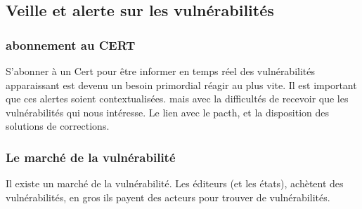 \subsection{Veille et alerte sur les vulnérabilités}

\subsubsection{abonnement au CERT}

S’abonner à un Cert pour être informer en temps réel des vulnérabilités apparaissant est devenu un besoin primordial réagir au plus vite. Il est important que ces alertes soient contextualisées.  mais avec la difficultés de recevoir que les vulnérabilités qui nous intéresse. Le lien avec le pacth, et la disposition des solutions de corrections.

\subsubsection{Le marché de la vulnérabilité}

Il existe un marché de la vulnérabilité. Les éditeurs (et les états), achètent des vulnérabilités, en gros ils payent des acteurs pour trouver de vulnérabilités.


 

